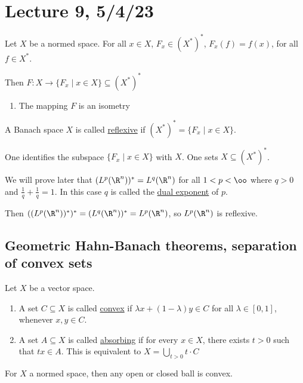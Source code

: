 \documentclass[x11names,reqno,14pt]{extarticle}
\begin{document}
\section*{Lecture 9, 5/4/23}

Let $X$ be a normed space. For all $x \in X$, $F_x \in (X^*)^*$, $F_x(f) = f(x)$, for all $f \in X^*$. 

Then $F:X\to\{F_x\mid x\in X\}\subseteq (X^*)^*$

\begin{enumerate}

\item The mapping $F$ is an isometry

\end{enumerate}


A Banach space $X$ is called \underline{reflexive} if $(X^*)^* = \{F_x \mid x\in X\}$. 

One identifies the subspace $\{F_x \mid x\in X\}$ with $X$. One sets $X \subseteq (X^*)^*$. 

We will prove later that $(L^p(\R^n))^* = L^q(\R^n)$ for all $1 < p < \oo$ where $q>0$ and $\frac{1}{q} + \frac{1}{q} = 1$. In this case $q$ is called the \underline{dual exponent} of $p$. 

Then $((L^p(\R^n))^*)^* = (L^q(\R^n))^* = L^p(\R^n)$, so $L^p(\R^n)$ is reflexive. 

\subsection*{Geometric Hahn-Banach theorems, separation of convex sets}


Let $X$ be a vector space. 

\begin{enumerate}

\item A set $C \subseteq X$ is called \underline{convex} if $\lambda x + (1 - \lambda)y \in C$ for all $\lambda\in[0,1]$, whenever $x, y \in C$. 

\item A set $A \subseteq X$ is called \underline{absorbing} if for every $x \in X$, there exists $t>0$ such that $tx\in A$. This is equivalent to $X = \bigcup_{t>0}t\cdot C$

\end{enumerate}

\exm 

For $X$ a normed space, then any open or closed ball is convex.
\end{document}
